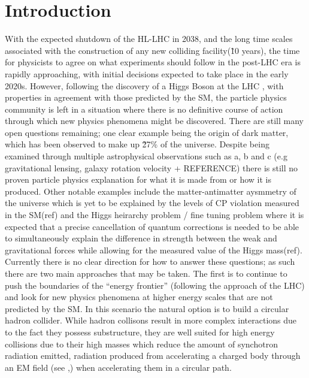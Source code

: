 \chapter{Introduction}

With the expected shutdown of the \ac{HL-LHC} in 2038, and the long time scales associated with the construction of any new colliding facility(\~10 years), the time for physicists to agree on what experiments should follow in the post-\ac{LHC} era is rapidly approaching, with initial decisions expected to take place in the early 2020s. However, following the discovery of a Higgs Boson at the \ac{LHC} \cite{:2012gk,Chatrchyan:2012xdj}, with properties in agreement with those predicted by the \ac{SM}, the particle physics community is left in a situation where there is no definitive course of action through which new physics phenomena might be discovered. There are still many open questions remaining; one clear example being the origin of dark matter, which has been observed to make up \~27\% of the universe. Despite being examined through multiple astrophysical observations such as a, b and c (e.g gravitational lensing, galaxy rotation velocity + REFERENCE) there is still no proven particle physics explanation for what it is made from or how it is produced. Other notable examples include the matter-antimatter aysmmetry of the universe which is yet to be explained by the levels of CP violation measured in the \ac{SM}(ref) and the Higgs heirarchy problem / fine tuning problem where it is expected that a precise cancellation of quantum corrections is needed to be able to simultaneously explain the difference in strength between the weak and gravitational forces while allowing for the measured value of the Higgs mass(ref). Currently there is no clear direction for how to answer these questions; as such there are two main approaches that may be taken. The first is to continue to push the boundaries of the ``energy frontier'' (following the approach of the \ac{LHC}) and look for new physics phenomena at higher energy scales that are not predicted by the \ac{SM}. In this scenario the natural option is to build a circular hadron collider. While hadron collisons result in more complex interactions due to the fact they possess substructure, they are well suited for high energy collisions due to their high masses which reduce the amount of synchotron radiation emitted, radiation produced from accelerating a charged body through an \ac{EM} field (see ,) when accelerating them in a circular path.

